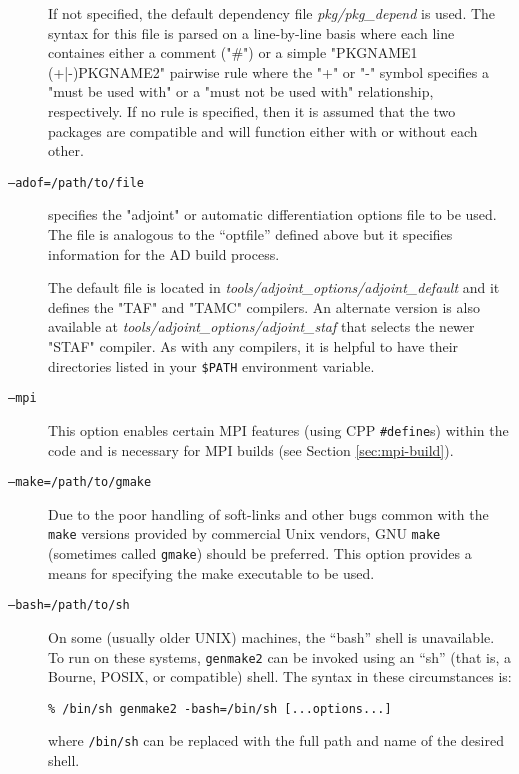 \begin{description}
  If not specified, the default dependency file {\em pkg/pkg\_depend}
  is used.  The syntax for this file is parsed on a line-by-line basis
  where each line containes either a comment ("\#") or a simple
  "PKGNAME1 (+|-)PKGNAME2" pairwise rule where the "+" or "-" symbol
  specifies a "must be used with" or a "must not be used with"
  relationship, respectively.  If no rule is specified, then it is
  assumed that the two packages are compatible and will function
  either with or without each other.
  
\item[\texttt{--adof=/path/to/file}] specifies the "adjoint" or
  automatic differentiation options file to be used.  The file is
  analogous to the ``optfile'' defined above but it specifies
  information for the AD build process.
  
  The default file is located in {\em
    tools/adjoint\_options/adjoint\_default} and it defines the "TAF"
  and "TAMC" compilers.  An alternate version is also available at
  {\em tools/adjoint\_options/adjoint\_staf} that selects the newer
  "STAF" compiler.  As with any compilers, it is helpful to have their
  directories listed in your {\tt \$PATH} environment variable.
  
\item[\texttt{--mpi}] This option enables certain MPI features (using
  CPP \texttt{\#define}s) within the code and is necessary for MPI
  builds (see Section \ref{sec:mpi-build}).
  
\item[\texttt{--make=/path/to/gmake}] Due to the poor handling of
  soft-links and other bugs common with the \texttt{make} versions
  provided by commercial Unix vendors, GNU \texttt{make} (sometimes
  called \texttt{gmake}) should be preferred.  This option provides a
  means for specifying the make executable to be used.
  
\item[\texttt{--bash=/path/to/sh}] On some (usually older UNIX)
  machines, the ``bash'' shell is unavailable.  To run on these
  systems, \texttt{genmake2} can be invoked using an ``sh'' (that is,
  a Bourne, POSIX, or compatible) shell.  The syntax in these
  circumstances is:
  \begin{center}
    \texttt{\%  /bin/sh genmake2 -bash=/bin/sh [...options...]}
  \end{center}
  where \texttt{/bin/sh} can be replaced with the full path and name
  of the desired shell.

\end{description}


